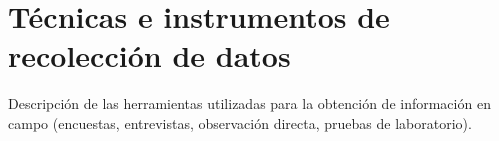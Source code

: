 \section{Técnicas e instrumentos de recolección de datos}
\label{sec:tecnicas_instrumentos}
Descripción de las herramientas utilizadas para la obtención de información en campo (encuestas, entrevistas, observación directa, pruebas de laboratorio).
